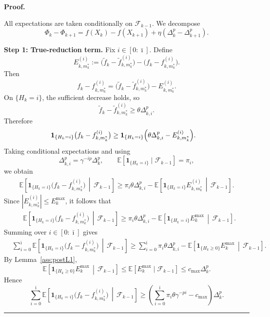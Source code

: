 \documentclass[11pt,a4paper]{article}
\newenvironment{proof}[1][Proof]{%
  \par\noindent\textbf{#1.}\ %
}{%
  \par\vspace{-0.5 ex}            %
  \noindent\hfill\rule{0.5em}{0.5em}\par
  \vspace{1ex}
}
\newcommand{\Imax}{\bar{\imath}}%
\newcommand{\Dexp}{p}
\begin{document}
\begin{proof}
All expectations are taken conditionally on $\mathcal F_{k-1}$. We decompose
\[
    \Phi_k-\Phi_{k+1}
    =
    f(X_k)-f(X_{k+1})
    +
    \eta(\Delta_k^\Dexp-\Delta_{k+1}^\Dexp).
\]

\medskip
\noindent
\textbf{Step 1: True-reduction term.}
Fix $i\in[0:\Imax]$. Define
\[
E_{k,m_k^*}^{(i)}
:=
\bigl(\tilde f_k-\tilde f_{k,m_k^*}^{(i)}\bigr)
-
\bigl(f_k-f_{k,m_k^*}^{(i)}\bigr).
\]
Then 
\[
f_k-f_{k,m_k^*}^{(i)}
=
\bigl(\tilde f_k-\tilde f_{k,m_k^*}^{(i)}\bigr)
-
E_{k,m_k^*}^{(i)}.
\]
On $\{H_k=i\}$, the sufficient decrease holds, so
\[
\tilde f_k-\tilde f_{k,m_k^*}^{(i)}
\geq
\theta\Delta_{k,i}^{\Dexp}
.
\]
Therefore
\[
\begin{aligned}
&\mathbf 1_{\{H_k=i\}}
\bigl(f_k-f_{k,m_k^*}^{(i)}\bigr)
\geq
\mathbf 1_{\{H_k=i\}}
\Bigl(
    \theta\Delta_{k,i}^{\Dexp}
    -
    E_{k,m_k^*}^{(i)}
\Bigr).
\end{aligned}
\]
Taking conditional expectations and using
\[
    \Delta_{k,i}^{\Dexp}
    =
    \gamma^{-i\Dexp }\Delta_k^\Dexp,
    \qquad
    \mathbb E[\mathbf 1_{\{H_k=i\}}\mid\mathcal F_{k-1}]
    =
    \pi_i,
\]
we obtain
\[
\begin{aligned}
\mathbb E\!\left[
    \mathbf 1_{\{H_k=i\}}
    \bigl(f_k-f_{k,m_k^*}^{(i)}\bigr)
    \,\middle|\,
    \mathcal F_{k-1}
\right]
\geq
\pi_i\theta\Delta_{k,i}^{\Dexp}
-
\mathbb E\!\left[
    \mathbf 1_{\{H_k=i\}}E_{k,m_k^*}^{(i)}
    \,\middle|\,
    \mathcal F_{k-1}
\right].
\end{aligned}
\]
Since $|E_{k,m_k^*}^{(i)}|\le E_k^{\max}$, it follows that 
\[
\begin{aligned}
&\mathbb E\!\left[
    \mathbf 1_{\{H_k=i\}}
    \bigl(f_k-f_{k,m_k^*}^{(i)}\bigr)
    \,\middle|\,
    \mathcal F_{k-1}
\right]
\ge
\pi_i\theta\Delta_{k,i}^{\Dexp}
-
\mathbb E\!\left[
    \mathbf 1_{\{H_k=i\}}E_k^{\max}
    \,\middle|\,
    \mathcal F_{k-1}
\right].
\end{aligned}
\]
Summing over $i\in[0:\Imax]$ gives
\[
\begin{aligned}
&\sum_{i=0}^{\Imax}
\mathbb E\!\left[
    \mathbf 1_{\{H_k=i\}}
    \bigl(f_k-f_{k,m_k^*}^{(i)}\bigr)
    \,\middle|\,
    \mathcal F_{k-1}
\right]
\ge
\sum_{i=0}^{\Imax}\pi_i\theta\Delta_{k,i}^{\Dexp}
-
\mathbb E\!\left[
    \mathbf 1_{\{H_k\ge0\}}E_k^{\max}
    \,\middle|\,
    \mathcal F_{k-1}
\right].
\end{aligned}
\]
By Lemma~\ref{ass:postL1},
\[
\mathbb E\!\left[
    \mathbf 1_{\{H_k\ge0\}}E_k^{\max}
    \,\middle|\,
    \mathcal F_{k-1}
\right]
\le
\mathbb E[E_k^{\max}\mid\mathcal F_{k-1}]
\le
c_{\max}\Delta_k^\Dexp.
\]
Hence
\begin{equation}\label{eq:true_red_explicit_2}
\sum_{i=0}^{\Imax}
\mathbb E\!\left[
    \mathbf 1_{\{H_k=i\}}
    \bigl(f_k-f_{k,m_k^*}^{(i)}\bigr)
    \,\middle|\,
    \mathcal F_{k-1}
\right]
\ge
\left(
    \sum_{i=0}^{\Imax}\pi_i\theta\gamma^{-\Dexp i}
    -
    c_{\max}
\right)
\Delta_k^\Dexp .
\end{equation}


\end{proof}
\end{document}
